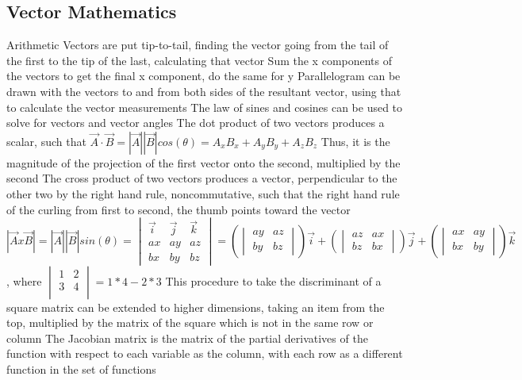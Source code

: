 \documentclass[11 pt, twoside]{article}
\newenvironment{outline*}
{
	\begin{outline}[enumerate]
	}
	{\end{outline}
}
\begin{document}
\subsection{Vector Mathematics}
\begin{outline*}
\1 Arithmetic
\2 Vectors are put tip-to-tail, finding the vector going from the tail of the first to the tip of the last, calculating that vector
\2 Sum the x components of the vectors to get the final x component, do the same for y
\2 Parallelogram can be drawn with the vectors to and from both sides of the resultant vector, using that to calculate the vector measurements
\1 The law of sines and cosines can be used to solve for vectors and vector angles
\1 The dot product of two vectors produces a scalar, such that $\vec{A} \cdot \vec{B} = |\vec{A}||\vec{B}|cos(\theta) = A_xB_x + A_yB_y + A_zB_z$
\2 Thus, it is the magnitude of the projection of the first vector onto the second, multiplied by the second
\1 The cross product of two vectors produces a vector, perpendicular to the other two by the right hand rule, noncommutative, such that the right hand rule of the curling from first to second, the thumb points toward the vector
\2 $|\vec{A} x \vec{B}| = |\vec{A}||\vec{B}|sin(\theta) = \begin{vmatrix} \vec{i} & \vec{j} & \vec{k} \\ ax & ay & az \\ bx & by & bz \end{vmatrix} = (\begin{vmatrix} ay & az \\ by & bz \end{vmatrix})\vec{i} +(\begin{vmatrix} az & ax \\ bz & bx \end{vmatrix})\vec{j} + (\begin{vmatrix} ax & ay \\ bx & by \end{vmatrix})\vec{k}$, where $\begin{vmatrix} 1 & 2 \\ 3 & 4 \\ \end{vmatrix} = 1*4 - 2*3$
\2 This procedure to take the discriminant of a square matrix can be extended to higher dimensions, taking an item from the top, multiplied by the matrix of the square which is not in the same row or column
\2 The Jacobian matrix is the matrix of the partial derivatives of the function with respect to each variable as the column, with each row as a different function in the set of functions
\end{outline*}
\end{document}
